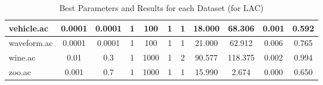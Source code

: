 \begin{table}[htbp]
\begin{tabular}{|l|c|c|c|c|c|c|c|c|c|c|}
		\hline
		vehicle.ac     & 0.0001   & 0.0001      & 1              & 100                 & 1             & 1             & 18.000         & 68.306         & 0.001          & 0.592          \\
		\hline
		waveform.ac    & 0.0001   & 0.0001      & 1              & 100                 & 1             & 1             & 21.000         & 62.912         & 0.006          & 0.765          \\
		\hline
		wine.ac        & 0.01     & 0.3         & 1              & 1000                & 1             & 2             & 90.577         & 118.375        & 0.002          & 0.994          \\
		\hline
		zoo.ac         & 0.001    & 0.7         & 1              & 1000                & 1             & 1             & 15.990         & 2.674          & 0.000          & 0.650          \\
		\hline
		\end{tabular}
	\caption{Best Parameters and Results for each Dataset (for LAC)}
	\label{tab:best_runs_for_each_db_lac}
\end{table}